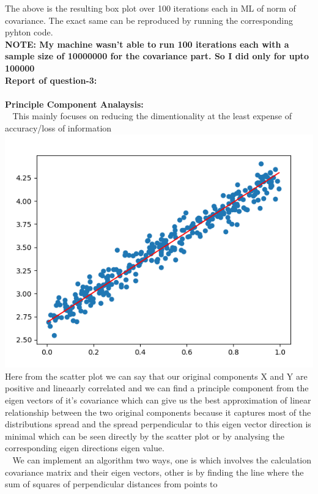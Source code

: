 \documentclass{article}
\begin{document}
    The above is the resulting box plot over 100 iterations each in ML of norm of covariance. The exact same can be reproduced by running the
    corresponding pyhton code.\\
    \textbf{NOTE: My machine wasn't able to run 100 iterations each with a sample size of 10000000 for the covariance part. So I did only for upto 100000}
\newpage
$$ $$
\textbf{Report of question-3:}\\
    \\
    \textbf{Principle Component Analaysis:}\\
    $~~~~$This mainly focuses on reducing the dimentionality at the least expense of accuracy/loss of information\\
    \includegraphics[scale=.5]{../results/q3/q3partB.png}\\
    Here from the scatter plot we can say that our original components X and Y are positive and lineaarly
    correlated and we can find a principle component from the eigen vectors of it's covariance which can give
    us the best approximation of linear relationship between the two original components because it captures
    most of the distributions spread and the spread perpendicular to this eigen vector direction is minimal
    which can be seen directly by the scatter plot or by analysing the corresponding eigen directions eigen value.\\
    $~~~~$We can implement an algorithm two ways, one is which involves the calculation covariance matrix and their 
    eigen vectors, other is by finding the line where the sum of squares of perpendicular distances from points to 
\end{document}
